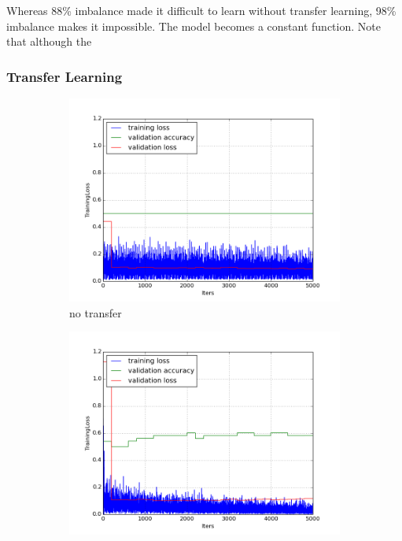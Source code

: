 \documentclass[a4paper,11pt]{article}
\begin{document}
Whereas 88\% imbalance made it difficult to learn without transfer learning, 98\% imbalance makes it impossible. The model becomes a constant function. Note that although the 

\subsubsection{Transfer Learning}


\begin{figure}
    \centering
    \begin{minipage}[b]{\textwidth}
      \begin{subfigure}{.5\textwidth} 
        \centering
        \includegraphics[scale=0.4]{images/plot_clampdetCI98_tl_wout.png}
        \caption{no transfer}\label{fig:2a}
      \end{subfigure}%
      \begin{subfigure}{.5\textwidth} 
        \centering
        \includegraphics[scale=0.4]{images/plot_clampdetCI98_none_reinit_bs128_lr4.png}

\end{subfigure}
\end{minipage}
\end{figure}
\end{document}
